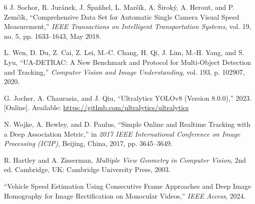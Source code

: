 \documentclass[conference]{IEEEtran}
\begin{document}
\begin{thebibliography}{6}
J. Sochor, R. Jur\'anek, J. \v{S}pa\v{n}hel, L. Mar\v{s}\'ik, A. \v{S}irok\'y, A. Herout, and P. Zem\v{c}\'ik, ``Comprehensive Data Set for Automatic Single Camera Visual Speed Measurement,'' \textit{IEEE Transactions on Intelligent Transportation Systems}, vol. 19, no. 5, pp. 1633--1643, May 2018.

L. Wen, D. Du, Z. Cai, Z. Lei, M.-C. Chang, H. Qi, J. Lim, M.-H. Yang, and S. Lyu, ``UA-DETRAC: A New Benchmark and Protocol for Multi-Object Detection and Tracking,'' \textit{Computer Vision and Image Understanding}, vol. 193, p. 102907, 2020.

G. Jocher, A. Chaurasia, and J. Qiu, ``Ultralytics YOLOv8 (Version 8.0.0),'' 2023. [Online]. Available: \url{https://github.com/ultralytics/ultralytics}

N. Wojke, A. Bewley, and D. Paulus, ``Simple Online and Realtime Tracking with a Deep Association Metric,'' in \textit{2017 IEEE International Conference on Image Processing (ICIP)}, Beijing, China, 2017, pp. 3645--3649.

R. Hartley and A. Zisserman, \textit{Multiple View Geometry in Computer Vision}, 2nd ed. Cambridge, UK: Cambridge University Press, 2003.

``Vehicle Speed Estimation Using Consecutive Frame Approaches and Deep Image Homography for Image Rectification on Monocular Videos,'' \textit{IEEE Access}, 2024.
\end{thebibliography}
\end{document}
